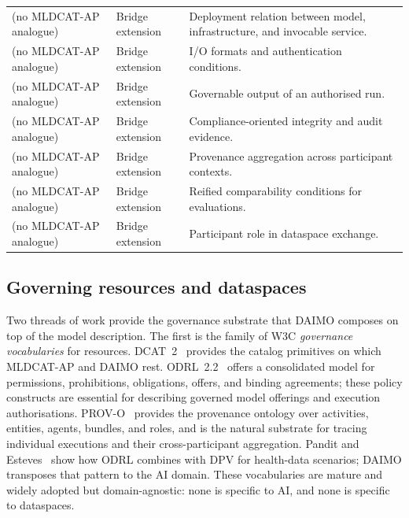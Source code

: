 \documentclass[11pt,a4paper]{article}
\begin{document}
\begin{table}[t]
\begin{tabular}{@{}p{3.6cm}p{2.4cm}p{8cm}@{}}
(no MLDCAT-AP analogue) & Bridge extension & Deployment relation between model, infrastructure, and invocable service. \\
(no MLDCAT-AP analogue) & Bridge extension & I/O formats and authentication conditions. \\
(no MLDCAT-AP analogue) & Bridge extension & Governable output of an authorised run. \\
(no MLDCAT-AP analogue) & Bridge extension & Compliance-oriented integrity and audit evidence. \\
(no MLDCAT-AP analogue) & Bridge extension & Provenance aggregation across participant contexts. \\
(no MLDCAT-AP analogue) & Bridge extension & Reified comparability conditions for evaluations. \\
(no MLDCAT-AP analogue) & Bridge extension & Participant role in dataspace exchange. \\
\bottomrule
\end{tabular}
\end{table}

\subsection{Governing resources and dataspaces}

Two threads of work provide the governance substrate that DAIMO composes on top of the model description. The first is the family of W3C \emph{governance vocabularies} for resources. DCAT~2~\cite{dcat2} provides the catalog primitives on which MLDCAT-AP and DAIMO rest. ODRL~2.2~\cite{odrl22} offers a consolidated model for permissions, prohibitions, obligations, offers, and binding agreements; these policy constructs are essential for describing governed model offerings and execution authorisations. PROV-O~\cite{provo} provides the provenance ontology over activities, entities, agents, bundles, and roles, and is the natural substrate for tracing individual executions and their cross-participant aggregation. Pandit and Esteves~\cite{pandit-esteves} show how ODRL combines with DPV for health-data scenarios; DAIMO transposes that pattern to the AI domain. These vocabularies are mature and widely adopted but domain-agnostic: none is specific to AI, and none is specific to dataspaces.
\end{document}
